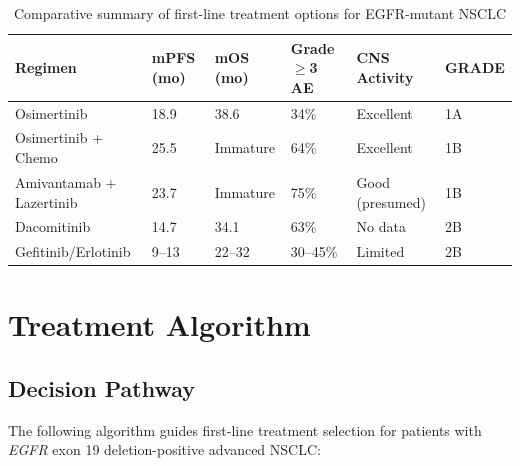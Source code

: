 \documentclass[10pt,letterpaper]{article}
\begin{document}
\begin{table}[H]
\centering
\small
\begin{tabular}{p{3.5cm}p{1.8cm}p{2.2cm}p{1.5cm}p{2.5cm}p{2.5cm}}
\toprule
\textbf{Regimen} & \textbf{mPFS (mo)} & \textbf{mOS (mo)} & \textbf{Grade $\geq$3 AE} & \textbf{CNS Activity} & \textbf{GRADE} \\
\midrule
Osimertinib & 18.9 & 38.6 & 34\% & Excellent & 1A \\
Osimertinib + Chemo & 25.5 & Immature & 64\% & Excellent & 1B \\
Amivantamab + Lazertinib & 23.7 & Immature & 75\% & Good (presumed) & 1B \\
Dacomitinib & 14.7 & 34.1 & 63\% & No data & 2B \\
Gefitinib/Erlotinib & 9--13 & 22--32 & 30--45\% & Limited & 2B \\
\bottomrule
\end{tabular}
\caption{Comparative summary of first-line treatment options for EGFR-mutant NSCLC}
\end{table}

\section{Treatment Algorithm}

\subsection{Decision Pathway}

The following algorithm guides first-line treatment selection for patients with \textit{EGFR} exon 19 deletion-positive advanced NSCLC:
\end{document}
